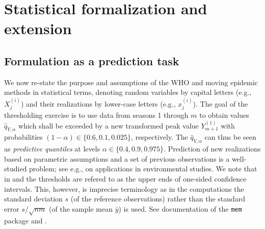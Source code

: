 \documentclass[12pt]{article}
\begin{document}
\section{Statistical formalization and extension}
\label{sec:formalization_extension}

\subsection{Formulation as a prediction task}
\label{subsec:reformulation}

We now re-state the purpose and assumptions of the WHO and moving epidemic methods in statistical terms, denoting random variables by capital letters (e.g., $X_j^{(i)}$) and their realizations by lower-case letters (e.g., $x_j^{(i)}$). The goal of the thresholding exercise is to use data from seasons 1 through $m$ to obtain values $\hat{q}_{Y, \alpha}$ which shall be exceeded by a new transformed peak value $Y_{m + 1}^{(1)}$ with probabilities $(1 - \alpha) \in \{0.6, 0.1, 0.025\}$, respectively. The $\hat{q}_{Y, \alpha}$ can thus be seen as \textit{predictive quantiles} at levels $\alpha \in \{0.4, 0.9, 0.975\}$. Prediction of new realizations based on parametric assumptions and a set of previous observations is a well-studied problem; see e.g., \cite{Millard2013} on applications in environmental studies. We note that in \cite{WHO2014} and \cite{Vega2015} the thresholds are refered to as the upper ends of one-sided confidence intervals. This, however, is imprecise terminology as in the computations the standard deviation $s$ (of the reference observations) rather than the standard error $s/\sqrt{nm}$ (of the sample mean $\bar{y}$) is used. See documentation of the \texttt{mem} package and \citet[p.69]{WHO2014}.
\end{document}
